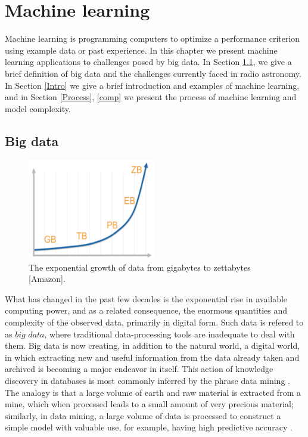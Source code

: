 
\chapter{Machine learning}
Machine learning is programming computers to optimize a performance
criterion using example data or past experience. In this chapter we present machine learning applications to challenges posed by big data. In Section \ref{BigD}, we give a brief definition of big data  and the challenges currently faced in radio astronomy. In Section \ref{Intro} we give a brief introduction and examples of machine learning,  and in Section \ref{Process}, \ref{comp} we  present the process of machine learning and model complexity.
\section{Big data}
\label{BigD}
\begin{figure}[H]
  \centering
    \includegraphics[width=0.5\textwidth]{images/Expgrowth.png}
    \caption{The exponential growth of data from gigabytes to zettabytes [Amazon].}
  \label{datagrowth.png}
\end{figure}
What has changed in the past few decades is the exponential rise in
available computing power, and as a related consequence, the enormous quantities and complexity of the observed data, primarily in digital form.  Such data is refered to as $\textit{big data}$, where traditional data-processing tools are inadequate to deal with them. Big data is now creating, in addition to the natural world, a digital world, in which extracting new and useful information from the data already taken and archived is becoming a major endeavor in itself. This action of knowledge discovery in databases is most commonly inferred by the phrase data mining \citep{ball2010data}. The analogy is that a large volume of earth and raw material is extracted from a mine, which when processed leads to a small
amount of very precious material; similarly, in data mining, a large volume
of data is processed to construct a simple model with valuable use, for example, having high predictive accuracy \citep{alpaydin2014introduction}.



